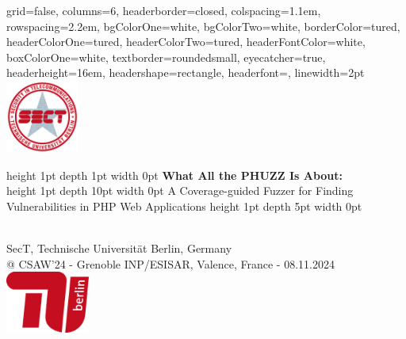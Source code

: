 \documentclass[a0paper,fontscale=0.29]{baposter}
\begin{document}
\def\mystrut(#1,#2){\vrule height #1pt depth #2pt width 0pt}   

\begin{poster}
{
grid=false,
columns=6,
headerborder=closed, %
colspacing=1.1em, %
rowspacing=2.2em,
bgColorOne=white, %
bgColorTwo=white, %
borderColor=tured, %
headerColorOne=tured, %
headerColorTwo=tured, %
headerFontColor=white, %
boxColorOne=white, %
textborder=roundedsmall, %
eyecatcher=true, %
headerheight=16em, %
headershape=rectangle, %
headerfont=\Large, %
linewidth=2pt %
}
%
{
\hspace*{1.5cm}    \includegraphics[height=6.5em]{images/sect.png}
} %
{
{\Huge{\strut{\normalfont \mystrut(1,1) \textbf{What All the PHUZZ Is About:}  \\ \mystrut(1,10) \huge A Coverage-guided Fuzzer for Finding \\ Vulnerabilities in PHP Web Applications \mystrut(1,5)}  }}
\vspace{0.5em}
} %
{
 \\ SecT, Technische Universität Berlin, Germany \\
{\small @ CSAW'24 - Grenoble INP/ESISAR, Valence, France - 08.11.2024}
}{
\includegraphics[height=5.5em]{images/tublogo.png} \hspace*{2cm}
} %


\end{poster}
\end{document}
